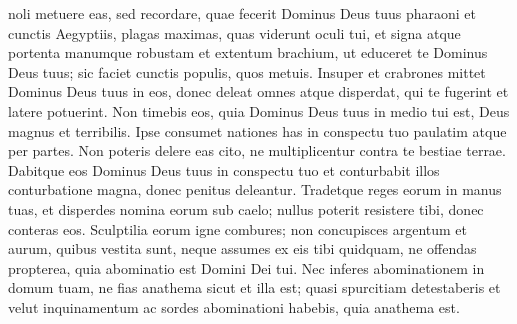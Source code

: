 \begin{biblechapter}
\begin{biblechapter}
\begin{biblechapter}
\begin{biblechapter}
\begin{biblechapter}
\begin{biblechapter}
\begin{biblechapter}
\verse noli metuere eas, sed recordare, quae fecerit Dominus Deus tuus pharaoni et cunctis Aegyptiis, 
\verse plagas maximas, quas viderunt oculi tui, et signa atque portenta manumque robustam et extentum brachium, ut educeret te Dominus Deus tuus; sic faciet cunctis populis, quos metuis. 
\verse Insuper et crabrones mittet Dominus Deus tuus in eos, donec deleat omnes atque disperdat, qui te fugerint et latere potuerint.
 \verse Non timebis eos, quia Dominus Deus tuus in medio tui est, Deus magnus et terribilis. 
\verse Ipse consumet nationes has in conspectu tuo paulatim atque per partes. Non poteris delere eas cito, ne multiplicentur contra te bestiae terrae. 
\verse Dabitque eos Dominus Deus tuus in conspectu tuo et conturbabit illos conturbatione magna, donec penitus deleantur. 
\verse Tradetque reges eorum in manus tuas, et disperdes nomina eorum sub caelo; nullus poterit resistere tibi, donec conteras eos.
 \verse Sculptilia eorum igne combures; non concupisces argentum et aurum, quibus vestita sunt, neque assumes ex eis tibi quidquam, ne offendas propterea, quia abominatio est Domini Dei tui. 
\verse Nec inferes abominationem in domum tuam, ne fias anathema sicut et illa est; quasi spurcitiam detestaberis et velut inquinamentum ac sordes abominationi habebis, quia anathema est.
 

\end{biblechapter}
\end{biblechapter}
\end{biblechapter}
\end{biblechapter}
\end{biblechapter}
\end{biblechapter}
\end{biblechapter}

